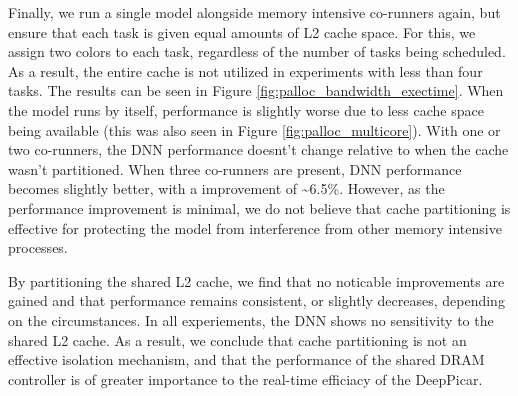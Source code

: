 Finally, we run a single model alongside memory intensive co-runners 
again, but ensure that each task is given equal amounts of L2 cache space.
For this, we assign two colors to each task, regardless of the number of
tasks being scheduled. As a result, the entire cache is not utilized in
experiments with less than four tasks. The results can be seen in Figure
\ref{fig:palloc_bandwidth_exectime}. When the model runs by itself, performance
is slightly worse due to less cache space being available (this was also seen in 
Figure \ref{fig:palloc_multicore}). With one or two co-runners, the DNN
performance doesnt't change relative to when the cache wasn't partitioned.
When three co-runners are present, DNN performance becomes slightly
better, with a improvement of \textasciitilde6.5\%. However, as the 
performance improvement is minimal, we do not believe that cache 
partitioning is effective for protecting the model from interference from
other memory intensive processes.

By partitioning the shared L2 cache, we find that no noticable 
improvements are gained and that performance remains consistent, or 
slightly decreases, depending on the circumstances. In all experiements,
the DNN shows no sensitivity to the shared L2 cache. As a result, we 
conclude that cache partitioning is not an effective isolation mechanism, 
and that the performance of the shared DRAM controller is of greater 
importance to the real-time efficiacy of the DeepPicar.
